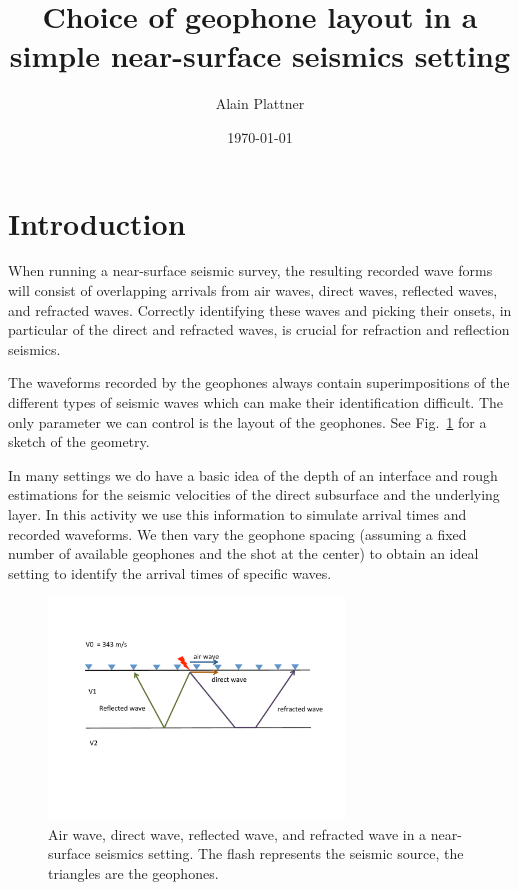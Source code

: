 \documentclass[11pt]{article}
\title{Choice of geophone layout in a simple near-surface seismics setting}
\date{\today}
\author{Alain Plattner}
\begin{document}
\maketitle

\section{Introduction}
When running a near-surface seismic survey, the resulting recorded
wave forms will consist of overlapping arrivals from air waves, direct
waves, reflected waves, and refracted waves. Correctly identifying
these waves and picking their onsets, in particular of the direct and
refracted waves, is crucial for refraction and reflection seismics.

The waveforms recorded by the geophones always contain
superimpositions of the different types of seismic waves which can
make their identification difficult.  The only parameter we can
control is the layout of the geophones. See Fig.~\ref{seismicwaves}
for a sketch of the geometry.

In many settings we do have a basic idea of the depth of an interface
and rough estimations for the seismic velocities of the direct
subsurface and the underlying layer.  In this activity we use this
information to simulate arrival times and recorded waveforms. We then
vary the geophone spacing (assuming a fixed number of available
geophones and the shot at the center) to obtain an ideal setting to
identify the arrival times of specific waves.


\begin{figure}
  \center
\includegraphics[width=0.7\textwidth, trim = 3cm 6cm 1.5cm
  3.5cm,clip]{figures/NSSeismics.pdf}
\caption{\label{seismicwaves} Air wave, direct wave, reflected wave,
  and refracted wave in a near-surface seismics setting. The flash
  represents the seismic source, the triangles are the geophones.}
\end{figure}
\end{document}
